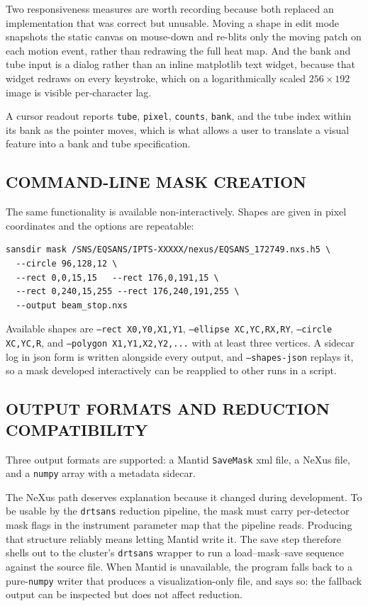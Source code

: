 \documentclass[tm]{ornltm}
\begin{document}
Two responsiveness measures are worth recording because both replaced an
implementation that was correct but unusable. Moving a shape in edit mode
snapshots the static canvas on mouse-down and re-blits only the moving patch on
each motion event, rather than redrawing the full heat map. And the bank and tube
input is a dialog rather than an inline matplotlib text widget, because that
widget redraws on every keystroke, which on a logarithmically scaled
$256\times192$ image is visible per-character lag.

A cursor readout reports \texttt{tube}, \texttt{pixel}, \texttt{counts},
\texttt{bank}, and the tube index within its bank as the pointer moves, which is
what allows a user to translate a visual feature into a bank and tube
specification.

\subsection{COMMAND-LINE MASK CREATION}

The same functionality is available non-interactively. Shapes are given in pixel
coordinates and the options are repeatable:

\begin{lstlisting}[language=shellsession]
sansdir mask /SNS/EQSANS/IPTS-XXXXX/nexus/EQSANS_172749.nxs.h5 \
  --circle 96,128,12 \
  --rect 0,0,15,15   --rect 176,0,191,15 \
  --rect 0,240,15,255 --rect 176,240,191,255 \
  --output beam_stop.nxs
\end{lstlisting}

Available shapes are \texttt{--rect X0,Y0,X1,Y1}, \texttt{--ellipse
XC,YC,RX,RY}, \texttt{--circle XC,YC,R}, and \texttt{--polygon
X1,Y1,X2,Y2,...} with at least three vertices. A sidecar log in \ac{json} form
is written alongside every output, and \texttt{--shapes-json} replays it, so a
mask developed interactively can be reapplied to other runs in a script.

\subsection{OUTPUT FORMATS AND REDUCTION COMPATIBILITY}

Three output formats are supported: a Mantid \texttt{SaveMask} \ac{xml} file, a
NeXus file, and a \texttt{numpy} array with a metadata sidecar.

The NeXus path deserves explanation because it changed during development. To be
usable by the \texttt{drtsans} reduction pipeline, the mask must carry per-detector
mask flags in the instrument parameter map that the pipeline reads. Producing
that structure reliably means letting Mantid write it. The save step therefore
shells out to the cluster's \texttt{drtsans} wrapper to run a
load--mask--save sequence against the source file. When Mantid is unavailable,
the program falls back to a pure-\texttt{numpy} writer that produces a
visualization-only file, and says so: the fallback output can be inspected but
does not affect reduction.
\end{document}
